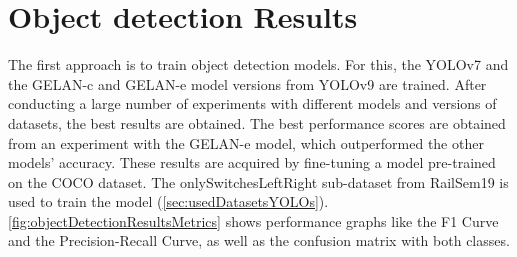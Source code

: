 \section{Object detection Results}
\label{sec:objectDetectionResults}

The first approach is to train object detection models.
For this, the \ac{YOLO}v7 and the \ac{GELAN}-c and \ac{GELAN}-e model versions from \ac{YOLO}v9 are trained.
After conducting a large number of experiments with different models and versions of datasets, the best results are obtained.
The best performance scores are obtained from an experiment with the \ac{GELAN}-e model, which outperformed the other models' accuracy.
These results are acquired by fine-tuning a model pre-trained on the COCO dataset.
The onlySwitchesLeftRight sub-dataset from RailSem19 is used to train the model (\autoref{sec:usedDatasetsYOLOs}).
\autoref{fig:objectDetectionResultsMetrics} shows performance graphs like the F1 Curve and the Precision-Recall Curve, as well as the confusion matrix with both classes.

\vspace{0.5cm}

